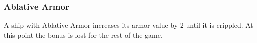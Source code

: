 \subsubsection{Ablative Armor}
A ship with Ablative Armor increases its armor value by 2 until it is crippled. At this point the bonus is lost for the rest of the game.